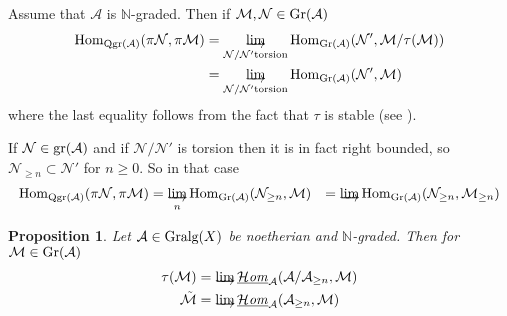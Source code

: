 \documentclass{amsproc}
\def \NN{{\mathbb N}}
\def\Ascr{{\mathcal A}}
\def\Hscr{{\mathcal H}}
\def\Mscr{{\mathcal M}}
\def\Nscr{{\mathcal N}}
\def\HHom{\operatorname {\Hscr \mathit{om}}}
\def\gr{\mathop{\text{gr}}}
\def\Gr{\mathop{\text{Gr}}}
\def\Gralg{\mathop{\text{Gralg}}}
\def\gr{\operatorname {gr}}
\def\Hom{\operatorname {Hom}}
\def\HHom{\operatorname {\Hscr \mathit{om}}}
\def\gr{\operatorname {gr}}
\def\Qgr{\operatorname {Qgr}}
\let\oldtext\text
\def\text#1{\oldtext{\upshape #1}}
\newtheorem{propositions}[lemmas]{Proposition}
\theoremstyle{definition}
\theoremstyle{remark}
\def\dirlim{\mathop{\vtop{\baselineskip -100pt\lineskip -1pt\lineskiplimit 0pt
\setbox0\hbox{\upshape lim}\copy0\hbox to \wd0{\rightarrowfill}}}\limits}
\numberwithin{equation}{section}
\numberwithin{table}{section}
\numberwithin{figure}{section}
\def\gr{\mathop{\text{gr}}}
\def\Gr{\mathop{\text{Gr}}}
\begin{document}
Assume that $\Ascr$ is $\NN$-graded. Then if $\Mscr,\Nscr\in \Gr(\Ascr)$ 
\begin{align*}
\Hom_{\Qgr(\Ascr)}(\pi\Nscr,\pi\Mscr)&=
\dirlim_{\Nscr/\Nscr'\text{ torsion}}
\Hom_{\Gr(\Ascr)}(\Nscr',\Mscr/\tau(\Mscr))\\
&=\dirlim_{\Nscr/\Nscr'\text{ torsion}} 
\Hom_{\Gr(\Ascr)}(\Nscr',\Mscr)
\end{align*}
where the last equality follows from the fact that $\tau$ is stable
(see  \cite{stenstrom}).

If $\Nscr\in\gr(\Ascr)$ and if $\Nscr/\Nscr'$ is torsion then it is in fact
right bounded, so $\Nscr_{\ge n}\subset \Nscr'$ for $n\ge 0$. So in that case
\begin{align*}
\Hom_{\Qgr(\Ascr)}(\pi\Nscr,\pi\Mscr)&=
\dirlim_n \Hom_{\Gr(\Ascr)}(\Nscr_{\ge n},\Mscr)
&=\dirlim\Hom_{\Gr(\Ascr)}(\Nscr_{\ge n},\Mscr_{\ge n})
\end{align*}
\begin{propositions}
\label{ref:3.8.4a}
  Let $\Ascr\in \Gralg(X)$ be noetherian and $\NN$-graded.  Then for
  $\Mscr\in\Gr(\Ascr)$
\begin{align}
\tau(\Mscr)&=\dirlim\underline{\HHom}_\Ascr(\Ascr/\Ascr_{\ge
  n},\Mscr)\label{ref:3.23a}\\
\tilde{\Mscr}&=\dirlim\underline{\HHom}_\Ascr(\Ascr_{\ge n},\Mscr)
\label{ref:3.24a}
\end{align}
\end{propositions}
\end{document}
